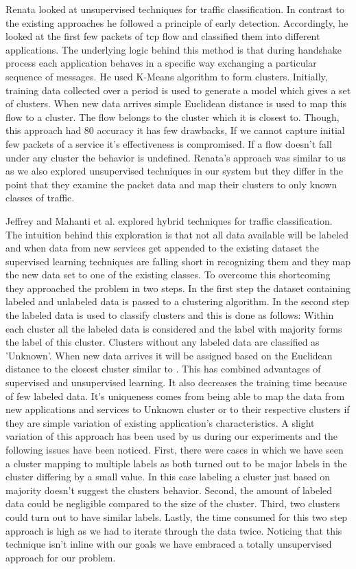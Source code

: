 Renata\cite{bernaille2006traffic} looked at unsupervised techniques for traffic classification. In contrast to the existing approaches he followed a principle of early detection. Accordingly, he looked at the first few packets of tcp flow and classified them into different applications. The underlying logic behind this method is that during handshake process each application behaves in a specific way exchanging a particular sequence of messages. 
He used K-Means algorithm to form clusters. Initially, training data collected over a period  is used to generate a model which gives a set of clusters. When new data arrives simple Euclidean distance is used to map this flow to a cluster. The flow belongs to the cluster which it is closest to. Though, this approach had 80 accuracy it has few drawbacks, If we cannot capture initial few packets of a service it's effectiveness is compromised. If a flow doesn't fall under any cluster the behavior is undefined.
Renata's \cite{bernaille2006traffic} approach was similar to us as we also explored unsupervised techniques in our system but they differ in the point that they examine the packet data and map their clusters to only known classes of traffic.

Jeffrey and Mahanti et al. \cite{erman2007semi} explored hybrid techniques for traffic classification. The intuition behind this exploration is that not all data available will be labeled and when data from new services get appended to the existing dataset the supervised learning techniques are falling short in recognizing them and they map the new data set to one of the existing classes. To overcome this shortcoming they approached the problem in two steps. In the first step the dataset containing labeled and unlabeled data is passed to a clustering algorithm. In the second step the labeled data is used to classify clusters and this is done as follows: Within each cluster all the labeled data is considered and the label with majority forms the label of this cluster. Clusters without any labeled data are classified as 'Unknown'. When new data arrives it will be assigned based on the Euclidean distance to the closest cluster similar to \cite{bernaille2006traffic} . This has combined advantages of supervised and unsupervised learning. It also decreases the training time because of few labeled data. It's uniqueness comes from being able to map the data from new applications and services to Unknown cluster or to their respective clusters if they are simple variation of existing application's characteristics. A slight variation of this approach has been used by us during our experiments and the following issues have been noticed. First, there were cases in which we have seen a cluster mapping to multiple labels as both turned out to be major labels in the cluster differing by a small value. In this case labeling a cluster just based on majority doesn't suggest the clusters behavior. Second, the amount  of labeled data could be negligible compared to the size of the cluster. Third, two clusters could turn out to have similar labels. Lastly, the time consumed for this two step approach is high as we had to iterate through the data twice. Noticing that this technique isn't inline with  our goals we have embraced a totally unsupervised approach for our problem.


